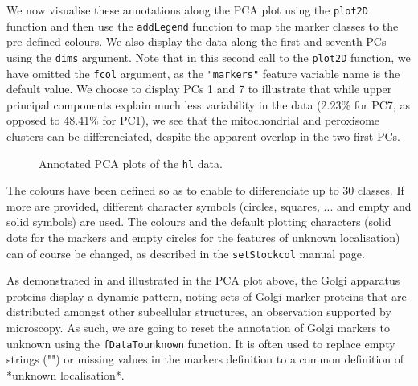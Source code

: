 We now visualise these annotations along the PCA plot using the
\texttt{plot2D} function and then use the \texttt{addLegend} function to map the
marker classes to the pre-defined colours. We also display the data
along the first and seventh PCs using the \texttt{dims} argument. Note that
in this second call to the \texttt{plot2D} function, we have omitted the
\texttt{fcol} argument, as the \texttt{"markers"} feature variable name is the
default value. We choose to display PCs 1 and 7 to illustrate that
while upper principal components explain much less variability in the
data (2.23\% for PC7, as opposed to 48.41\% for PC1), we see that the
mitochondrial and peroxisome clusters can be differenciated, despite
the apparent overlap in the two first PCs.

\begin{figure}[!ht]
  \centering
\begin{knitrout}
\color{fgcolor}\begin{kframe}
\begin{alltt}
\hlstd{(} \hlstd{=} \hlstd{(}\hlstd{,} \hlstd{))}
  \hlstd{=} \hlstd{)}
  \hlstd{=} \hlstd{)}
  \hlstd{=} \hlstd{(}\hlstd{,} \hlstd{),}  \hlstd{=} \hlstd{)}
\end{alltt}
\end{kframe}
\end{knitrout}
  \caption{Annotated PCA plots of the \texttt{hl} data.}
  \label{fig:plotmarkers}
\end{figure}


The colours have been defined so as to enable to differenciate up to
30 classes. If more are provided, different character symbols
(circles, squares, ... and empty and solid symbols) are used. The
colours and the default plotting characters (solid dots for the
markers and empty circles for the features of unknown localisation)
can of course be changed, as described in the \texttt{setStockcol} manual
page.

As demonstrated in \cite{hyper} and illustrated in the PCA plot above,
the Golgi apparatus proteins display a dynamic pattern, noting sets of
Golgi marker proteins that are distributed amongst other subcellular
structures, an observation supported by microscopy. As such, we are
going to reset the annotation of Golgi markers to unknown using the
\texttt{fDataTounknown} function. It is often used to replace empty
strings ("") or missing values in the markers definition to a common
definition of *unknown localisation*.

